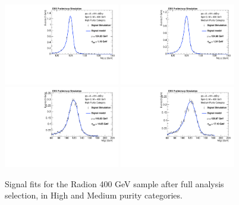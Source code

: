 \begin{figure}[h]
  \centering
  \includegraphics[width=0.45\textwidth]{figures/sec-signals/Rad400_signal_fit_mgg_cat0}\hfil
  \includegraphics[width=0.45\textwidth]{figures/sec-signals/Rad400_signal_fit_mgg_cat1}\hfil
  \includegraphics[width=0.45\textwidth]{figures/sec-signals/Rad400_signal_fit_mjj_cat0}\hfil
  \includegraphics[width=0.45\textwidth]{figures/sec-signals/Rad400_signal_fit_mjj_cat1}\hfil
  \caption{Signal fits for the Radion 400 GeV sample after full analysis selection, in High and Medium purity categories.}
  \label{fig:rad400}
\end{figure}


